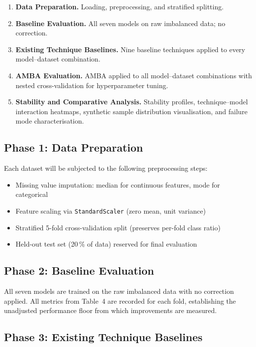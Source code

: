 \documentclass[11pt,a4paper]{article}
\begin{document}
\begin{enumerate}[label=\textbf{Phase \arabic*.}, leftmargin=*, itemsep=4pt]
  \item \textbf{Data Preparation.} Loading, preprocessing, and stratified splitting.
  \item \textbf{Baseline Evaluation.} All seven models on raw imbalanced data; no correction.
  \item \textbf{Existing Technique Baselines.} Nine baseline techniques applied to every
        model--dataset combination.
  \item \textbf{AMBA Evaluation.} AMBA applied to all model--dataset combinations with
        nested cross-validation for hyperparameter tuning.
  \item \textbf{Stability and Comparative Analysis.} Stability profiles, technique--model
        interaction heatmaps, synthetic sample distribution visualisation, and failure mode
        characterisation.
\end{enumerate}

\subsection{Phase 1: Data Preparation}

Each dataset will be subjected to the following preprocessing steps:
\begin{itemize}[itemsep=2pt]
  \item Missing value imputation: median for continuous features, mode for categorical
  \item Feature scaling via \texttt{StandardScaler} (zero mean, unit variance)
  \item Stratified 5-fold cross-validation split (preserves per-fold class ratio)
  \item Held-out test set (20\,\% of data) reserved for final evaluation
\end{itemize}

\subsection{Phase 2: Baseline Evaluation}

All seven models are trained on the raw imbalanced data with no correction applied. All
metrics from Table~4 are recorded for each fold, establishing the unadjusted performance
floor from which improvements are measured.

\subsection{Phase 3: Existing Technique Baselines}
\end{document}

